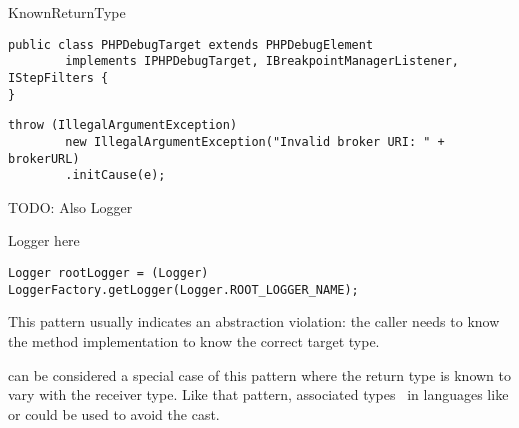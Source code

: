 \begin{pattern}{KnownReturnType}
\begin{verbatim}
public class PHPDebugTarget extends PHPDebugElement
        implements IPHPDebugTarget, IBreakpointManagerListener, IStepFilters {
}
\end{verbatim}

\def\urlvar{http://bit.ly/apache_activemq_2EnSivc}

\begin{verbatim}
throw (IllegalArgumentException)
        new IllegalArgumentException("Invalid broker URI: " + brokerURL)
        .initCause(e);
\end{verbatim}


TODO: Also Logger

Logger here
\def\urlvar{http://bit.ly/skylot_jadx_2HIoR9X}

\begin{verbatim}
Logger rootLogger = (Logger) LoggerFactory.getLogger(Logger.ROOT_LOGGER_NAME);
\end{verbatim}


\discussion{}
This pattern usually indicates an abstraction violation: the caller 
needs to know the method implementation to know the correct target type.

   can be considered a special case of this
  pattern where the return type is known to vary with the receiver type.
  Like that pattern, associated types~\cite{chakravartyAssociatedTypeSynonyms2005}
  in languages like \haskell{} or \rust{} 
  could be used to avoid the cast.

\end{pattern}



